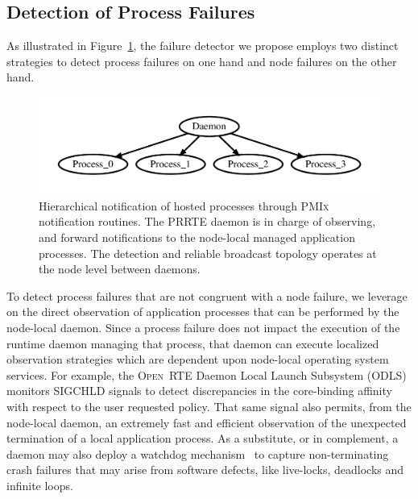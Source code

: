 \documentclass[sigconf]{acmart}
\newcommand{\prrte}[0]{\textsc{PRRTE}\xspace}
\newcommand{\pmix}[0]{\textsc{PMIx}\xspace}
\newcommand{\orte}[0]{\textsc{Open~RTE}\xspace}
\begin{document}
\subsection{Detection of Process Failures}

As illustrated in Figure~\ref{fig:hosted}, the failure detector we propose
employs two distinct strategies to detect process failures on one hand
and node failures on the other hand.

\begin{figure}[h]
  \centering
  \includegraphics[width=\linewidth]{server_client.pdf}
  \caption{Hierarchical notification of hosted processes through \pmix notification routines. The \prrte daemon is in charge of observing, and forward notifications to the node-local managed application processes. The detection and reliable broadcast
  topology operates at the node level between daemons.}\label{fig:hosted}
\end{figure}

To detect process failures that are not congruent with a node failure, we
leverage on the direct observation of application processes that can be
performed by the node-local daemon. Since a process failure does not
impact the execution of the runtime daemon managing that process, that
daemon can execute localized observation strategies which are dependent
upon node-local operating system services. For example, the \orte Daemon
Local Launch Subsystem (ODLS) monitors SIGCHLD signals to detect discrepancies
in the core-binding affinity with respect to the user requested policy.
That same signal also permits, from the node-local daemon, an extremely fast and efficient observation
of the unexpected termination of a local application process. As a substitute,
or in complement, a daemon may also deploy a watchdog mechanism~\cite{CASTAIN18}
to capture non-terminating crash failures that may arise from software
defects, like live-locks, deadlocks and infinite loops.
\end{document}
